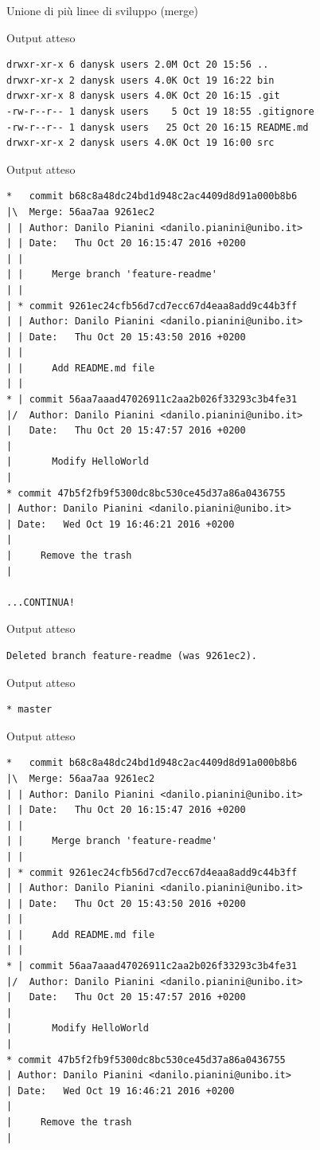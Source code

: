 \documentclass[xcolor=dvipsnames,presentation]{beamer}
\begin{document}
\begin{frame}{Unione di più linee di sviluppo (merge)}
\begin{block}{Output atteso}
\begin{Verbatim}[fontsize=\scriptsize]
drwxr-xr-x 6 danysk users 2.0M Oct 20 15:56 ..
drwxr-xr-x 2 danysk users 4.0K Oct 19 16:22 bin
drwxr-xr-x 8 danysk users 4.0K Oct 20 16:15 .git
-rw-r--r-- 1 danysk users    5 Oct 19 18:55 .gitignore
-rw-r--r-- 1 danysk users   25 Oct 20 16:15 README.md
drwxr-xr-x 2 danysk users 4.0K Oct 19 16:00 src
        \end{Verbatim}
    \end{block}
    \begin{block}{Output atteso}
        \begin{Verbatim}[fontsize=\tiny]
*   commit b68c8a48dc24bd1d948c2ac4409d8d91a000b8b6
|\  Merge: 56aa7aa 9261ec2
| | Author: Danilo Pianini <danilo.pianini@unibo.it>
| | Date:   Thu Oct 20 16:15:47 2016 +0200
| |
| |     Merge branch 'feature-readme'
| |
| * commit 9261ec24cfb56d7cd7ecc67d4eaa8add9c44b3ff
| | Author: Danilo Pianini <danilo.pianini@unibo.it>
| | Date:   Thu Oct 20 15:43:50 2016 +0200
| |
| |     Add README.md file
| |
* | commit 56aa7aaad47026911c2aa2b026f33293c3b4fe31
|/  Author: Danilo Pianini <danilo.pianini@unibo.it>
|   Date:   Thu Oct 20 15:47:57 2016 +0200
|
|       Modify HelloWorld
|
* commit 47b5f2fb9f5300dc8bc530ce45d37a86a0436755
| Author: Danilo Pianini <danilo.pianini@unibo.it>
| Date:   Wed Oct 19 16:46:21 2016 +0200
|
|     Remove the trash
|

...CONTINUA!
        \end{Verbatim}
    \end{block}
    \begin{block}{Output atteso}
        \begin{Verbatim}[fontsize=\scriptsize]
Deleted branch feature-readme (was 9261ec2).
        \end{Verbatim}
    \end{block}
    \begin{block}{Output atteso}
        \begin{Verbatim}[fontsize=\scriptsize]
* master
        \end{Verbatim}
    \end{block}
    \begin{block}{Output atteso}
        \begin{Verbatim}[fontsize=\tiny]
*   commit b68c8a48dc24bd1d948c2ac4409d8d91a000b8b6
|\  Merge: 56aa7aa 9261ec2
| | Author: Danilo Pianini <danilo.pianini@unibo.it>
| | Date:   Thu Oct 20 16:15:47 2016 +0200
| |
| |     Merge branch 'feature-readme'
| |
| * commit 9261ec24cfb56d7cd7ecc67d4eaa8add9c44b3ff
| | Author: Danilo Pianini <danilo.pianini@unibo.it>
| | Date:   Thu Oct 20 15:43:50 2016 +0200
| |
| |     Add README.md file
| |
* | commit 56aa7aaad47026911c2aa2b026f33293c3b4fe31
|/  Author: Danilo Pianini <danilo.pianini@unibo.it>
|   Date:   Thu Oct 20 15:47:57 2016 +0200
|
|       Modify HelloWorld
|
* commit 47b5f2fb9f5300dc8bc530ce45d37a86a0436755
| Author: Danilo Pianini <danilo.pianini@unibo.it>
| Date:   Wed Oct 19 16:46:21 2016 +0200
|
|     Remove the trash
|


\end{Verbatim}
\end{block}
\end{frame}
\end{document}
